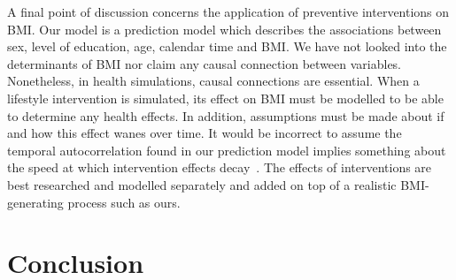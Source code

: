 \documentclass{imammb}
\numberwithin{equation}{section}
\begin{document}
A final point of discussion concerns the application of preventive interventions on BMI. Our model is a prediction model which describes the associations between sex, level of education, age, calendar time and BMI. We have not looked into the determinants of BMI nor claim any causal connection between variables. Nonetheless, in health simulations, causal connections are essential. When a lifestyle intervention is simulated, its effect on BMI must be modelled to be able to determine any health effects. In addition, assumptions must be made about if and how this effect wanes over time. It would be incorrect to assume the temporal autocorrelation found in our prediction model implies something about the speed at which intervention effects decay~\citep{Bayer2011}. The effects of interventions are best researched and modelled separately and added on top of a realistic BMI-generating process such as ours.




\section{Conclusion}
\label{sec:Conclusion}
\end{document}

